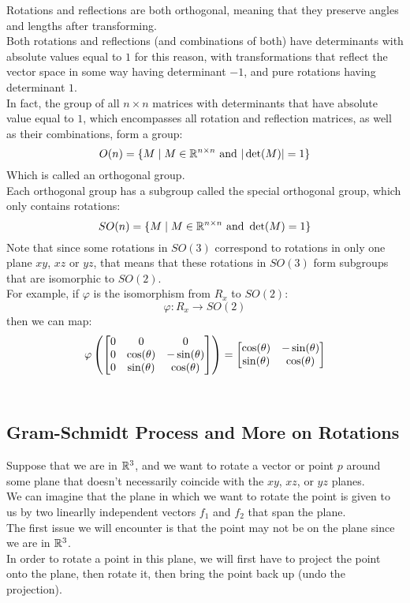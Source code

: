 \documentclass[12pt]{article}
\begin{document}
Rotations and reflections are both
orthogonal, meaning that they preserve
angles and lengths after transforming. \\
Both rotations and reflections
(and combinations of both)
have determinants with absolute values
equal to $1$ for this reason,
with transformations that reflect
the vector space in some way having
determinant $-1$,
and pure rotations having determinant $1$. \\

In fact, the group of all $n \times n$
matrices with determinants
that have absolute value equal to $1$,
which encompasses all rotation and reflection
matrices, as well as their combinations,
form a group:
\[ O(n) = \{ M \mid M \in \mathbb{R}^{n \times n}
\text{ and } |\det(M)| = 1 \} \]
Which is called an orthogonal group. \\

Each orthogonal group has a
subgroup called the special
orthogonal group, which only contains
rotations:
\[ SO(n) = \{ M \mid M \in \mathbb{R}^{n \times n}
\text{ and } \det(M) = 1 \} \]
Note that since some
rotations in $SO(3)$
correspond to rotations in only
one plane $xy$, $xz$ or $yz$,
that means that these rotations
in $SO(3)$ form subgroups that are
isomorphic to $SO(2)$. \\

For example, if $\varphi$
is the isomorphism from $R_x$
to $SO(2)$:
\[ \varphi: R_x \to SO(2) \]
then we can map:
\[ \varphi\left( 
\begin{bmatrix} 0 & 0 & 0 \\ 0 & \cos(\theta) & -\sin(\theta) \\ 0 & \sin(\theta) & \cos(\theta) \end{bmatrix} \right)
= \begin{bmatrix} \cos(\theta) & -\sin(\theta) \\ \sin(\theta) & \cos(\theta) \end{bmatrix} \] \\

\newpage

\subsection*{Gram-Schmidt Process and
More on Rotations}

Suppose that we are in $\mathbb{R}^3$,
and we want to rotate
a vector or point $p$ around some plane
that doesn't necessarily coincide
with the $xy$, $xz$, or $yz$ planes. \\

We can imagine that the plane in which we
want to rotate the point is given to
us by two linearlly independent vectors
$f_1$ and $f_2$ that span the plane. \\

The first issue we will encounter is that
the point may not be on the plane
since we are in $\mathbb{R}^3$. \\
In order to rotate a point in this plane,
we will first have to project the point
onto the plane,
then rotate it, then bring the point back up
(undo the projection). \\
\end{document}

